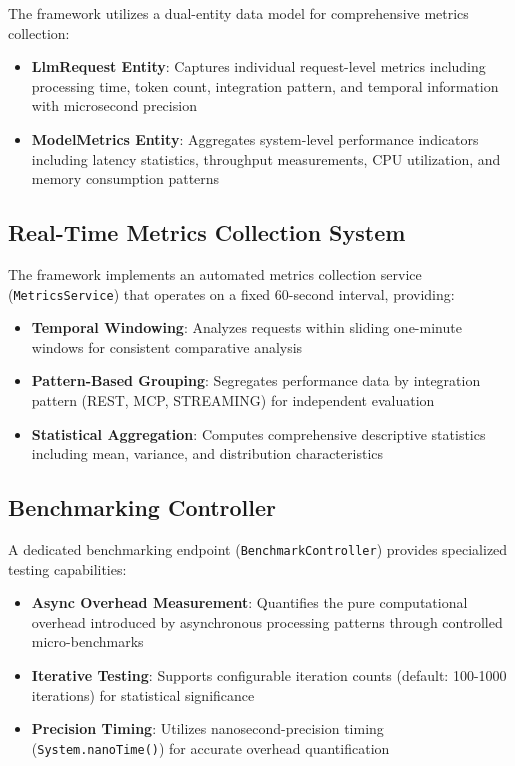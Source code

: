 The framework utilizes a dual-entity data model for comprehensive metrics collection:

\begin{itemize}
    \item \textbf{LlmRequest Entity}: Captures individual request-level metrics including processing time, token count, integration pattern, and temporal information with microsecond precision
    \item \textbf{ModelMetrics Entity}: Aggregates system-level performance indicators including latency statistics, throughput measurements, CPU utilization, and memory consumption patterns
\end{itemize}


\subsection{Real-Time Metrics Collection System}

The framework implements an automated metrics collection service (\texttt{MetricsService}) that operates on a fixed 60-second interval, providing:

\begin{itemize}
    \item \textbf{Temporal Windowing}: Analyzes requests within sliding one-minute windows for consistent comparative analysis
    \item \textbf{Pattern-Based Grouping}: Segregates performance data by integration pattern (REST, MCP, STREAMING) for independent evaluation
    \item \textbf{Statistical Aggregation}: Computes comprehensive descriptive statistics including mean, variance, and distribution characteristics
\end{itemize}


\subsection{Benchmarking Controller}

A dedicated benchmarking endpoint (\texttt{BenchmarkController}) provides specialized testing capabilities:

\begin{itemize}
    \item \textbf{Async Overhead Measurement}: Quantifies the pure computational overhead introduced by asynchronous processing patterns through controlled micro-benchmarks
    \item \textbf{Iterative Testing}: Supports configurable iteration counts (default: 100-1000 iterations) for statistical significance
    \item \textbf{Precision Timing}: Utilizes nanosecond-precision timing (\texttt{System.nanoTime()}) for accurate overhead quantification
\end{itemize}



